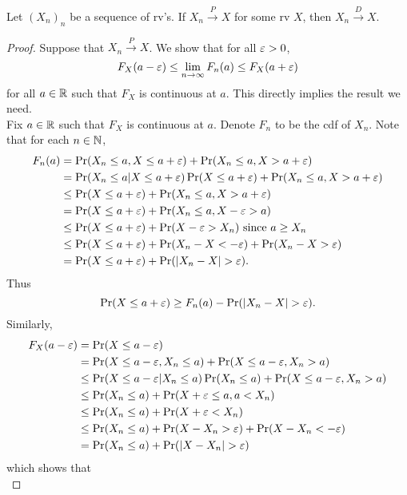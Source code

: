 \documentclass[11pt,fleqn]{book} %
\begin{document}
\begin{theorem} \label{thm:422}
Let \((X_n)_n\) be a sequence of rv's. If \(X_n \xrightarrow{P}X\) for some rv \(X\), then \(X_n\xrightarrow{D}X\).
\end{theorem}
\begin{proof}
Suppose that \(X_n \xrightarrow{P}X\). We show that for all \(\varepsilon > 0\),
\[
F_X(a - \varepsilon) \leq \lim_{n\rightarrow\infty}F_n(a) \leq F_X(a + \varepsilon)
\]
for all \(a \in \mathbb{R}\) such that \(F_X\) is continuous at \(a\). This directly implies the result we need.\\
\indent Fix \(a \in \mathbb{R}\) such that \(F_X\) is continuous at \(a\). Denote \(F_n\) to be the cdf of \(X_n\). Note that for each \(n \in \mathbb{N}\), 
\[
\begin{aligned}
F_n(a) &= \Pr(X_n \leq a, X \leq a + \varepsilon) + \Pr(X_n \leq a, X > a + \varepsilon) \\
&= \Pr(X_n \leq a | X \leq a + \varepsilon)\Pr(X \leq a + \varepsilon) + \Pr(X_n \leq a, X > a + \varepsilon) \\
&\leq \Pr(X \leq a + \varepsilon) + \Pr(X_n \leq a, X > a + \varepsilon) \\
&= \Pr(X \leq a + \varepsilon) + \Pr(X_n \leq a, X - \varepsilon > a) \\
&\leq \Pr(X \leq a + \varepsilon) + \Pr(X - \varepsilon > X_n) \text{ since } a \geq X_n \\
&\leq \Pr(X \leq a + \varepsilon) + \Pr(X_n - X < -\varepsilon) + \Pr(X_n - X > \varepsilon) \\
&= \Pr(X \leq a + \varepsilon) + \Pr(|X_n - X| > \varepsilon).
\end{aligned}
\]
\indent Thus 
\begin{equation} \label{eqn:4221}
\Pr(X \leq a + \varepsilon) \geq F_n(a) - \Pr(|X_n - X| > \varepsilon).
\end{equation}
\indent Similarly, 
\[
\begin{aligned}
F_X(a - \varepsilon) &= \Pr(X \leq a - \varepsilon) \\
&= \Pr(X \leq a - \varepsilon, X_n \leq a) + \Pr(X \leq a - \varepsilon, X_n > a) \\
&\leq \Pr(X \leq a - \varepsilon|X_n\leq a)\Pr(X_n \leq a) + \Pr(X \leq a - \varepsilon, X_n > a) \\
&\leq \Pr(X_n \leq a) + \Pr(X + \varepsilon \leq a, a < X_n) \\
&\leq \Pr(X_n \leq a) + \Pr(X + \varepsilon < X_n) \\
&\leq \Pr(X_n \leq a) + \Pr(X - X_n > \varepsilon) + \Pr(X - X_n < -\varepsilon) \\
&= \Pr(X_n \leq a) + \Pr(|X - X_n| > \varepsilon)
\end{aligned}
\]
which shows that
\begin{equation} \label{eqn:4222}

\end{equation}
\end{proof}
\end{document}
